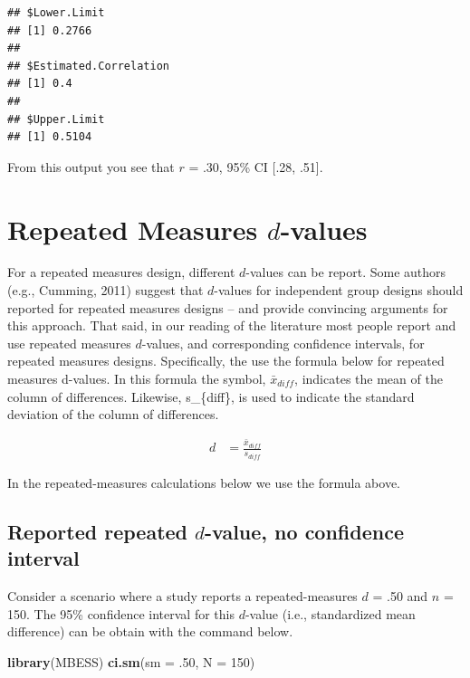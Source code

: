 \documentclass[
]{krantz}
\makeatletter
\newenvironment{Shaded}{\begin{snugshade}}{\end{snugshade}}
\newcommand{\DataTypeTok}[1]{\textcolor[rgb]{0.27,0.27,0.27}{#1}}
\newcommand{\DecValTok}[1]{\textcolor[rgb]{0.06,0.06,0.06}{#1}}
\newcommand{\FloatTok}[1]{\textcolor[rgb]{0.06,0.06,0.06}{#1}}
\newcommand{\KeywordTok}[1]{\textcolor[rgb]{0.27,0.27,0.27}{\textbf{#1}}}
\newcommand{\NormalTok}[1]{#1}
\newenvironment{kframe}{%
\medskip{}
\setlength{\fboxsep}{.8em}
 \def\at@end@of@kframe{}%
 \ifinner\ifhmode%
  \def\at@end@of@kframe{\end{minipage}}%
  \begin{minipage}{\columnwidth}%
 \fi\fi%
 \def\FrameCommand##1{\hskip\@totalleftmargin \hskip-\fboxsep
 \colorbox{shadecolor}{##1}\hskip-\fboxsep
     \hskip-\linewidth \hskip-\@totalleftmargin \hskip\columnwidth}%
 \MakeFramed {\advance\hsize-\width
   \@totalleftmargin\z@ \linewidth\hsize
   \@setminipage}}%
 {\par\unskip\endMakeFramed%
 \at@end@of@kframe}
\renewenvironment{Shaded}{\begin{kframe}}{\end{kframe}}
\makeatother
\begin{document}
\begin{verbatim}
## $Lower.Limit
## [1] 0.2766
## 
## $Estimated.Correlation
## [1] 0.4
## 
## $Upper.Limit
## [1] 0.5104
\end{verbatim}

From this output you see that \(r\) = .30, 95\% CI {[}.28, .51{]}.

\hypertarget{repeated-measures-d-values}{%
\section{\texorpdfstring{Repeated Measures \(d\)-values}{Repeated Measures d-values}}\label{repeated-measures-d-values}}

For a repeated measures design, different \(d\)-values can be report. Some authors (e.g., Cumming, 2011) suggest that \(d\)-values for independent group designs should reported for repeated measures designs -- and provide convincing arguments for this approach. That said, in our reading of the literature most people report and use repeated measures \(d\)-values, and corresponding confidence intervals, for repeated measures designs. Specifically, the use the formula below for repeated measures d-values. In this formula the symbol, \(\bar{x}_{diff}\), indicates the mean of the column of differences. Likewise, s\_\{diff\}, is used to indicate the standard deviation of the column of differences.

\[
\begin{aligned}
d & = \frac{\bar{x}_{diff}}{s_{diff}}
\end{aligned}
\]

In the repeated-measures calculations below we use the formula above.

\hypertarget{reported-repeated-d-value-no-confidence-interval}{%
\subsection{\texorpdfstring{Reported repeated \(d\)-value, no confidence interval}{Reported repeated d-value, no confidence interval}}\label{reported-repeated-d-value-no-confidence-interval}}

Consider a scenario where a study reports a repeated-measures \(d\) = .50 and \(n\) = 150. The 95\% confidence interval for this \(d\)-value (i.e., standardized mean difference) can be obtain with the command below.

\begin{Shaded}
\begin{Highlighting}[]
\KeywordTok{library}\NormalTok{(MBESS)}
\KeywordTok{ci.sm}\NormalTok{(}\DataTypeTok{sm =} \FloatTok{.50}\NormalTok{, }\DataTypeTok{N =} \DecValTok{150}\NormalTok{) }
\end{Highlighting}
\end{Shaded}
\end{document}
